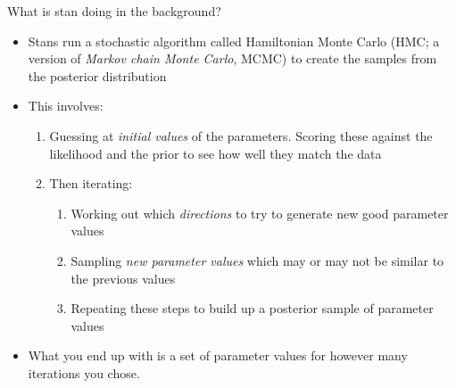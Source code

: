 \documentclass[ignorenonframetext,]{beamer}
\providecommand{\tightlist}{%
  \setlength{\itemsep}{0pt}\setlength{\parskip}{0pt}}
\begin{document}
\begin{frame}{What is stan doing in the background?}

\begin{itemize}
\item
  Stans run a stochastic algorithm called Hamiltonian Monte Carlo (HMC;
  a version of \emph{Markov chain Monte Carlo}, MCMC) to create the
  samples from the posterior distribution
\item
  This involves:

  \begin{enumerate}
  \def\labelenumi{\arabic{enumi}.}
  \tightlist
  \item
    Guessing at \emph{initial values} of the parameters. Scoring these
    against the likelihood and the prior to see how well they match the
    data
  \item
    Then iterating:

    \begin{enumerate}
    \def\labelenumii{\arabic{enumii}.}
    \tightlist
    \item
      Working out which \emph{directions} to try to generate new good
      parameter values
    \item
      Sampling \emph{new parameter values} which may or may not be
      similar to the previous values
    \item
      Repeating these steps to build up a posterior sample of parameter
      values
    \end{enumerate}
  \end{enumerate}
\item
  What you end up with is a set of parameter values for however many
  iterations you chose.
\end{itemize}

\end{frame}
\end{document}
